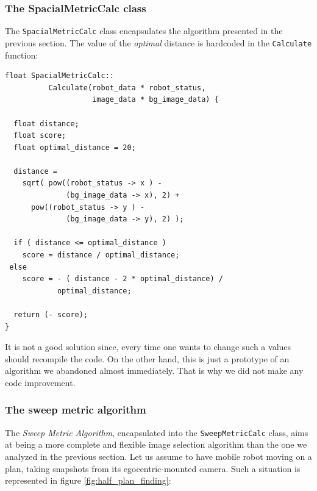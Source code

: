 \subsubsection{The SpacialMetricCalc class}
\label{concr:iimageselector:spacial_metric_class}

The \texttt{SpacialMetricCalc} class encapsulates the 
algorithm presented in the previous section.
The value of the \textit{optimal} distance is hardcoded in the
\texttt{Calculate} function:

\begin{lstlisting}[caption={\texttt{SweepMetricCalc} class declaration}, label={code:sweepmetriccalc}, frame=trBL]
float SpacialMetricCalc::
          Calculate(robot_data * robot_status, 
                    image_data * bg_image_data) {

  float distance;
  float score;
  float optimal_distance = 20;

  distance = 
    sqrt( pow((robot_status -> x ) - 
              (bg_image_data -> x), 2) +
	  pow((robot_status -> y ) - 
              (bg_image_data -> y), 2) );

  if ( distance <= optimal_distance )
    score = distance / optimal_distance;
 else
    score = - ( distance - 2 * optimal_distance) /
            optimal_distance;

  return (- score);
}
\end{lstlisting}

It is not a good solution since, every time one wants to change 
such a values should recompile the code. 
On the other hand, this is just a prototype of an algorithm we 
abandoned almost immediately. That is why we did not make any 
code improvement.


\subsubsection{The sweep metric algorithm}
\label{concr:iimageselector:sweep_metric_algorithm}

The  \textit{Sweep Metric Algorithm}, encapsulated into the 
\texttt{SweepMetricCalc} class, aims at being a more 
complete and flexible image selection algorithm than the one 
we analyzed in the previous section.
Let us assume to have  mobile robot moving on a plan, 
taking snapshots from its egocentric-mounted camera.
Such a situation is represented in figure 
\ref{fig:half_plan_finding}:

